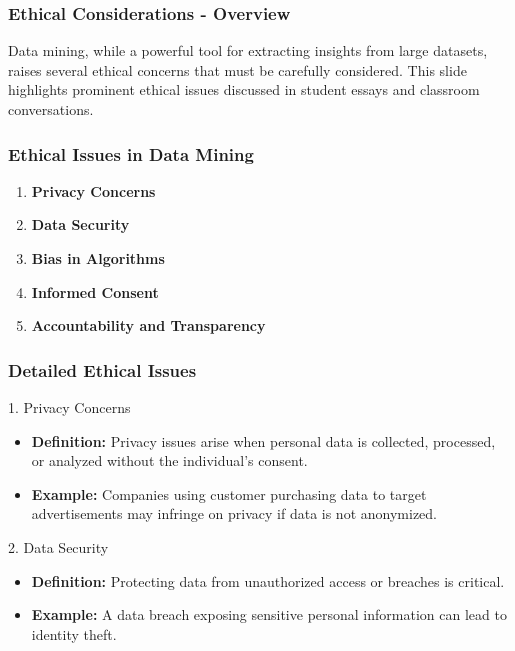 \documentclass[aspectratio=169]{beamer}
\begin{document}
\begin{frame}[fragile]
    \frametitle{Ethical Considerations - Overview}
    Data mining, while a powerful tool for extracting insights from large datasets, raises several ethical concerns that must be carefully considered. This slide highlights prominent ethical issues discussed in student essays and classroom conversations.
\end{frame}

\begin{frame}[fragile]
    \frametitle{Ethical Issues in Data Mining}
    \begin{enumerate}
        \item \textbf{Privacy Concerns}
        \item \textbf{Data Security}
        \item \textbf{Bias in Algorithms}
        \item \textbf{Informed Consent}
        \item \textbf{Accountability and Transparency}
    \end{enumerate}
\end{frame}

\begin{frame}[fragile]
    \frametitle{Detailed Ethical Issues}
    \begin{block}{1. Privacy Concerns}
        \begin{itemize}
            \item \textbf{Definition:} Privacy issues arise when personal data is collected, processed, or analyzed without the individual's consent.
            \item \textbf{Example:} Companies using customer purchasing data to target advertisements may infringe on privacy if data is not anonymized.
        \end{itemize}
    \end{block}

    \begin{block}{2. Data Security}
        \begin{itemize}
            \item \textbf{Definition:} Protecting data from unauthorized access or breaches is critical.
            \item \textbf{Example:} A data breach exposing sensitive personal information can lead to identity theft.
        \end{itemize}
    \end{block}
\end{frame}
\end{document}
